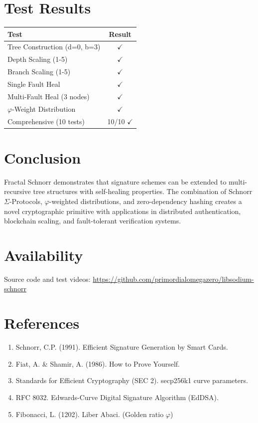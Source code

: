 \documentclass{article}
\begin{document}
\section{Test Results}

\begin{center}
\begin{tabular}{|l|c|}
\hline
\textbf{Test} & \textbf{Result} \\
\hline
Tree Construction (d=0, b=3) & $\checkmark$ \\
Depth Scaling (1-5) & $\checkmark$ \\
Branch Scaling (1-5) & $\checkmark$ \\
Single Fault Heal & $\checkmark$ \\
Multi-Fault Heal (3 nodes) & $\checkmark$ \\
$\varphi$-Weight Distribution & $\checkmark$ \\
Comprehensive (10 tests) & 10/10 $\checkmark$ \\
\hline
\end{tabular}
\end{center}

\section{Conclusion}

Fractal Schnorr demonstrates that signature schemes can be extended to multi-recursive tree structures with self-healing properties. The combination of Schnorr $\Sigma$-Protocols, $\varphi$-weighted distributions, and zero-dependency hashing creates a novel cryptographic primitive with applications in distributed authentication, blockchain scaling, and fault-tolerant verification systems.

\section*{Availability}

Source code and test videos: \url{https://github.com/primordialomegazero/libsodium-schnorr}

\section*{References}

\begin{enumerate}
\item Schnorr, C.P. (1991). Efficient Signature Generation by Smart Cards.
\item Fiat, A. \& Shamir, A. (1986). How to Prove Yourself.
\item Standards for Efficient Cryptography (SEC 2). secp256k1 curve parameters.
\item RFC 8032. Edwards-Curve Digital Signature Algorithm (EdDSA).
\item Fibonacci, L. (1202). Liber Abaci. (Golden ratio $\varphi$)
\end{enumerate}
\end{document}
